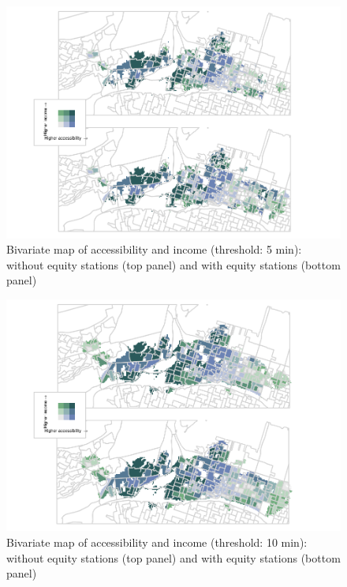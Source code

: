 \documentclass[]{elsarticle} %
\begin{document}
\begin{figure}
\includegraphics[width=1\linewidth]{Bike-share-spatial-equity_files/figure-latex/figure-bi-map-threshold-5-1} \caption{\label{fig-bivariate-map-threshold-5}Bivariate map of accessibility and income (threshold: 5 min): without equity stations (top panel) and with equity stations (bottom panel)}\label{fig:figure-bi-map-threshold-5}
\end{figure}

\begin{figure}
\includegraphics[width=1\linewidth]{Bike-share-spatial-equity_files/figure-latex/figure-bi-map-threshold-10-1} \caption{\label{fig-bivariate-map-threshold-10}Bivariate map of accessibility and income (threshold: 10 min): without equity stations (top panel) and with equity stations (bottom panel)}\label{fig:figure-bi-map-threshold-10}
\end{figure}
\end{document}
